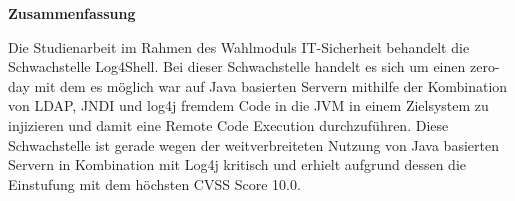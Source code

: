 
\textbf{\large Zusammenfassung}
\begin{justify}
Die Studienarbeit im Rahmen des Wahlmoduls IT-Sicherheit behandelt die Schwachstelle Log4Shell.
Bei dieser Schwachstelle handelt es sich um einen zero-day mit dem es möglich war auf Java basierten
Servern mithilfe der Kombination von LDAP, JNDI und log4j fremdem Code in die JVM in einem Zielsystem zu
injizieren und damit eine Remote Code Execution durchzuführen.
Diese Schwachstelle ist gerade wegen der weitverbreiteten
Nutzung von Java basierten Servern in Kombination mit Log4j kritisch und erhielt aufgrund dessen die Einstufung
mit dem höchsten CVSS Score 10.0.
\end{justify}


